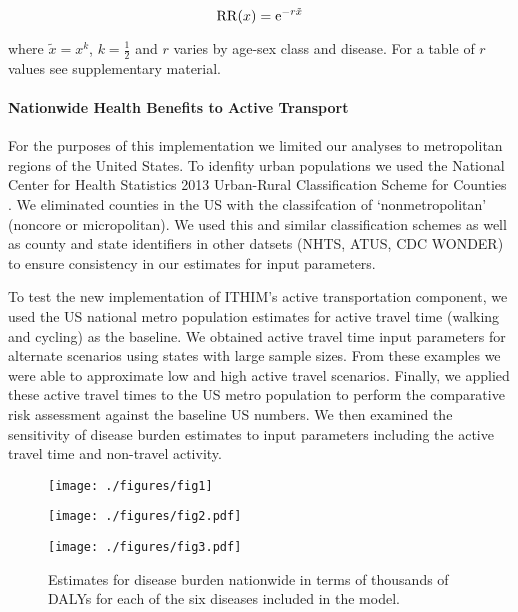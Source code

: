 \begin{equation}
\mathrm{RR}(x) = \mathrm{e}^{-r \tilde{x}}
\end{equation}

where $\tilde{x} = x^k$, $k=\frac{1}{2}$ and $r$ varies by age-sex
class and disease.  For a table of $r$ values see supplementary
material.

\paragraph{Nationwide Health Benefits to Active Transport}

For the purposes of this implementation we limited our analyses to
metropolitan regions of the United States. To idenfity urban
populations we used the National Center for Health Statistics 2013
Urban-Rural Classification Scheme for Counties \cite{ingram2014}. We
eliminated counties in the US with the classifcation of
`nonmetropolitan' (noncore or micropolitan). We used this and similar
classification schemes as well as county and state identifiers in
other datsets (NHTS, ATUS, CDC WONDER) to ensure consistency in our
estimates for input parameters.

To test the new implementation of ITHIM's active transportation
component, we used the US national metro population estimates for
active travel time (walking and cycling) as the baseline. We obtained
active travel time input parameters for alternate scenarios using
states with large sample sizes. From these examples we were able to
approximate low and high active travel scenarios. Finally, we applied
these active travel times to the US metro population to perform the
comparative risk assessment against the baseline US numbers. We then
examined the sensitivity of disease burden estimates to input
parameters including the active travel time and non-travel activity.

\begin{figure}[t]
  \centerline{\texttt{[image: ./figures/fig1]}}
    \caption{}\label{fig1}
\end{figure}

\begin{figure}[t]
  \centerline{\texttt{[image: ./figures/fig2.pdf]}}
    \caption{}\label{fig2}
\end{figure}

\begin{figure}[t]
  \centerline{\texttt{[image: ./figures/fig3.pdf]}}
  \caption{Estimates for disease burden nationwide in terms of thousands of
    DALYs for each of the six diseases included in the model.
  }\label{fig3}
\end{figure}
